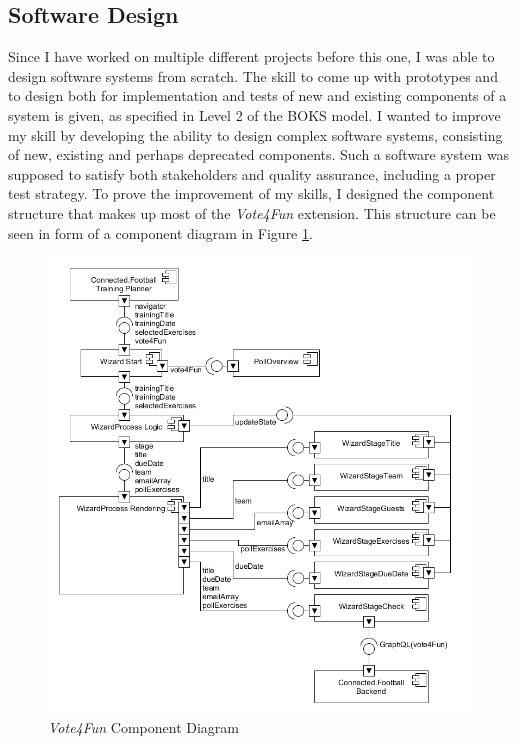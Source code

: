 \subsection{Software Design}
\label{ssec:software_design}

Since I have worked on multiple different projects before this one, I was able to design software systems from scratch. The skill to come up with prototypes and to design both for implementation and tests of new and existing components of a system is given, as specified in Level 2 of the BOKS model.
\newline
I wanted to improve my skill by developing the ability to design complex software systems, consisting of new, existing and perhaps deprecated components. Such a software system was supposed to satisfy both stakeholders and quality assurance, including a proper test strategy.
\newline
To prove the improvement of my skills, I designed the component structure that makes up most of the \textit{Vote4Fun} extension. This structure can be seen in form of a component diagram in Figure \ref{fig:component_diagram}.

\begin{figure}[H]
    \centering
    \includegraphics[width=\textwidth]{images/component_diagram.png}
    \caption{\textit{Vote4Fun} Component Diagram}
    \label{fig:component_diagram}
\end{figure}

